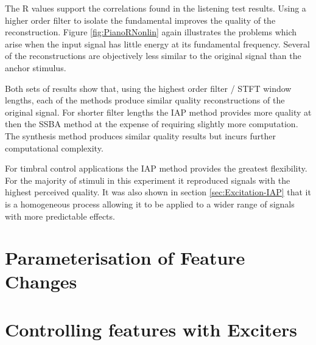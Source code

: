 		The R values support the correlations found in the listening test results. Using a higher order
		filter to isolate the fundamental improves the quality of the reconstruction. Figure \ref{fig:PianoRNonlin}
		again illustrates the problems which arise when the input signal has little energy at its fundamental
		frequency. Several of the reconstructions are objectively less similar to the original signal than the
		anchor stimulus.

		Both sets of results show that, using the highest order filter / STFT window lengths, each of the methods
		produce similar quality reconstructions of the original signal. For shorter filter lengths the IAP method
		provides more quality at then the SSBA method at the expense of requiring slightly more computation. The
		synthesis method produces similar quality results but incurs further computational complexity. 
		
		For timbral control applications the IAP method provides the greatest flexibility. For the majority of
		stimuli in this experiment it reproduced signals with the highest perceived quality. It was also shown in
		section \ref{sec:Excitation-IAP} that it is a homogeneous process allowing it to be applied to a wider
		range of signals with more predictable effects.

\section{Parameterisation of Feature Changes}
\label{sec:FeatureControl-Parameterisation}

\section{Controlling features with Exciters}
\label{sec:FeatureControl-Control}
